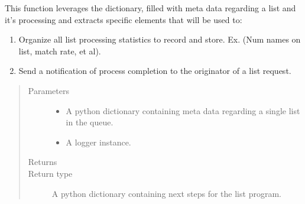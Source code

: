 \documentclass[letterpaper,10pt,english]{sphinxmanual}
\begin{document}

\begin{fulllineitems}
\label{\detokenize{index:ListManagement.utility.processes.extract_dictionary_values}}
This function leverages the dictionary, filled with meta data regarding a list and it’s processing
and extracts specific elements that will be used to:
\begin{enumerate}
\def\theenumi{\arabic{enumi}}
\def\labelenumi{\theenumi )}
\makeatletter\def\p@enumii{\p@enumi \theenumi )}\makeatother
\item {} 
Organize all list processing statistics to record and store. Ex. (Num names on list, match rate, et al).

\item {} 
Send a notification of process completion to the originator of a list request.

\end{enumerate}
\begin{quote}\begin{description}
\item[{Parameters}] \leavevmode\begin{itemize}
\item {} 
 \textendash{} A python dictionary containing meta data regarding a single list in the queue.

\item {} 
 \textendash{} A logger instance.

\end{itemize}

\item[{Returns}] \leavevmode


\item[{Return type}] \leavevmode
A python dictionary containing next steps for the list program.

\end{description}\end{quote}

\end{fulllineitems}

\end{document}
